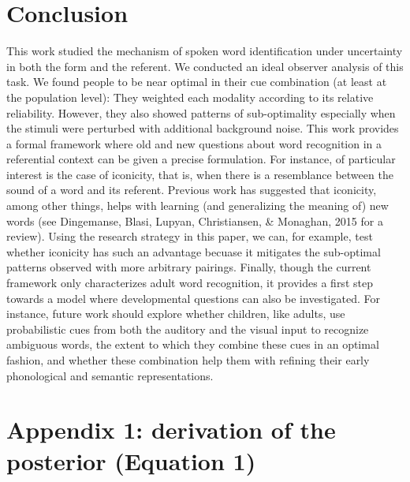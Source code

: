 \documentclass[english,floatsintext,man]{apa6}
\theoremstyle{definition}
\theoremstyle{definition}
\theoremstyle{definition}
\theoremstyle{remark}
\begin{document}
\section{Conclusion}\label{conclusion}

This work studied the mechanism of spoken word identification under
uncertainty in both the form and the referent. We conducted an ideal
observer analysis of this task. We found people to be near optimal in
their cue combination (at least at the population level): They weighted
each modality according to its relative reliability. However, they also
showed patterns of sub-optimality especially when the stimuli were
perturbed with additional background noise. This work provides a formal
framework where old and new questions about word recognition in a
referential context can be given a precise formulation. For instance, of
particular interest is the case of iconicity, that is, when there is a
resemblance between the sound of a word and its referent. Previous work
has suggested that iconicity, among other things, helps with learning
(and generalizing the meaning of) new words (see Dingemanse, Blasi,
Lupyan, Christiansen, \& Monaghan, 2015 for a review). Using the
research strategy in this paper, we can, for example, test whether
iconicity has such an advantage becuase it mitigates the sub-optimal
patterns observed with more arbitrary pairings. Finally, though the
current framework only characterizes adult word recognition, it provides
a first step towards a model where developmental questions can also be
investigated. For instance, future work should explore whether children,
like adults, use probabilistic cues from both the auditory and the
visual input to recognize ambiguous words, the extent to which they
combine these cues in an optimal fashion, and whether these combination
help them with refining their early phonological and semantic
representations.

\vspace{1em}

\vspace{1em}

\section{Appendix 1: derivation of the posterior (Equation
1)}\label{appendix-1-derivation-of-the-posterior-equation-1}
\end{document}
